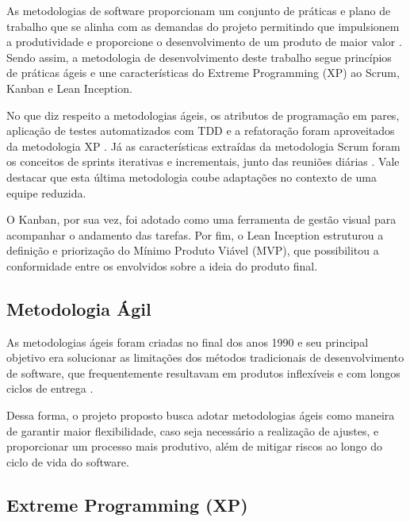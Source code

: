 

As metodologias de software proporcionam um conjunto de práticas e plano de trabalho que se alinha com as demandas do projeto permitindo que impulsionem a produtividade e proporcione o desenvolvimento de um produto de maior valor \cite{kent_2004}. Sendo assim, a metodologia de desenvolvimento deste trabalho segue princípios de práticas ágeis e une características do Extreme Programming (XP) ao Scrum, Kanban e Lean Inception. 

No que diz respeito a metodologias ágeis, os atributos de programação em pares, aplicação de testes automatizados com TDD e a refatoração foram aproveitados da metodologia XP \cite{highsmith_2000}. Já as características extraídas da metodologia Scrum foram os conceitos de sprints iterativas e incrementais, junto das reuniões diárias \cite{schwaber_scrum_2013}. Vale destacar que esta última metodologia coube adaptações no contexto de uma equipe reduzida. 

O Kanban, por sua vez, foi adotado como uma ferramenta de gestão visual para acompanhar o andamento das tarefas. Por fim, o Lean Inception estruturou a definição e priorização do Mínimo Produto Viável (MVP), que possibilitou a conformidade entre os envolvidos sobre a ideia do produto final.



\subsection{Metodologia Ágil}


As metodologias ágeis foram criadas no final dos anos 1990 e seu principal objetivo era solucionar as limitações dos métodos tradicionais de desenvolvimento de software, que frequentemente resultavam em produtos inflexíveis e com longos ciclos de entrega \cite{kent_2004}.

Dessa forma, o projeto proposto busca adotar metodologias ágeis como maneira de garantir maior flexibilidade, caso seja necessário a realização de ajustes, e proporcionar um processo mais produtivo, além de mitigar riscos ao longo do ciclo de vida do software.




\subsection{Extreme Programming (XP)}

